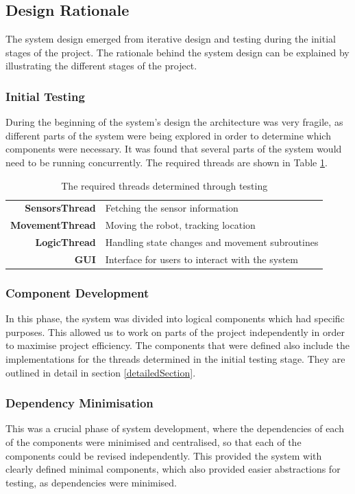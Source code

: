 \subsection{Design Rationale}
The system design emerged from iterative design and testing during the initial stages of the project. The rationale behind the system design can be explained by illustrating the different stages of the project.

\subsubsection{Initial Testing}
During the beginning of the system's design the architecture was very fragile, as different parts of the system were being explored in order to determine which components were necessary. It was found that several parts of the system would need to be running concurrently. The required threads are shown in Table \ref{designInit}.

\begin{table}[H]
\begin{tabular}{>{\bfseries}r l}
	SensorsThread & Fetching the sensor information \\
	MovementThread & Moving the robot, tracking location \\
	LogicThread & Handling state changes and movement subroutines \\
	GUI & Interface for users to interact with the system \\
\end{tabular}
\caption{\label{designInit}The required threads determined through testing}
\end{table}

\subsubsection{Component Development}
In this phase, the system was divided into logical components which had specific purposes. This allowed us to work on parts of the project independently in order to maximise project efficiency. The components that were defined also include the implementations for the threads determined in the initial testing stage. They are outlined in detail in section \ref{detailedSection}.

\subsubsection{Dependency Minimisation}
This was a crucial phase of system development, where the dependencies of each of the components were minimised and centralised, so that each of the components could be revised independently. This provided the system with clearly defined minimal components, which also provided easier abstractions for testing, as dependencies were minimised.
